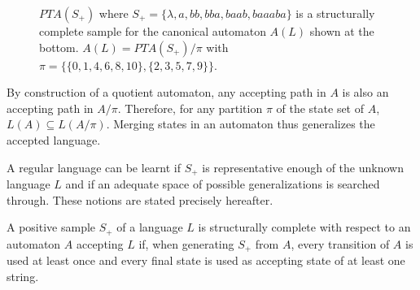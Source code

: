 \begin{figure}
\begin{center}
\caption[$PTA(S_+)$ where $S_+ = \{\lambda,a,bb,bba,baab,baaaba\}$ is a structurally complete sample 
for the canonical automaton $A(L)$ shown at the bottom.]{$PTA(S_+)$ where $S_+ = \{\lambda,a,bb,bba,baab,baaaba\}$ is a structurally complete sample 
for the canonical automaton $A(L)$ shown at the bottom. $A(L) = PTA(S_+)/\pi$ with $\pi=\{\{0,1,4,6,8,10\},\{2,3,5,7,9\}\}$.\label{fig:pta:quotient}}
\end{center}
\end{figure}

By construction of a quotient automaton, any accepting path in $A$ is also an accepting path in $A/\pi$. Therefore, for any partition $\pi$ of the state set of $A$, $L(A) \subseteq L(A/\pi) $. Merging states in an automaton thus generalizes the accepted language.
 
A regular language can be learnt if $S_+$ is representative enough of the unknown language $L$ and if an adequate space of possible generalizations is searched through. These notions are stated precisely hereafter.

\begin{definition} A positive sample $S_+$ of a language $L$ is structurally complete with respect to an automaton $A$ accepting $L$ if, when generating $S_+$ from $A$, every transition of $A$ is used at least once and every final state is used as accepting state of at least one string.
\label{structural:completeness}
\end{definition}

